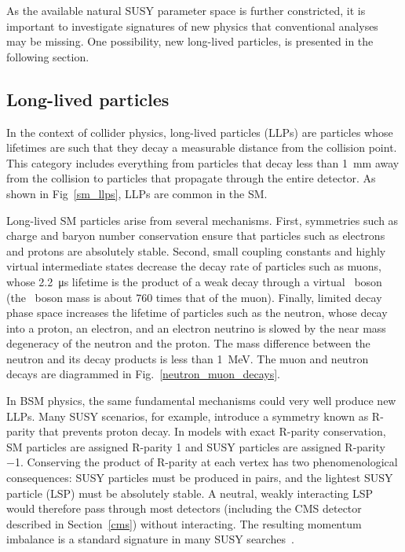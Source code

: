 

As the available natural SUSY parameter space is further constricted, it is important to investigate signatures of new physics that conventional analyses may be missing. One possibility, new long-lived particles, is presented in the following section.

\subsection{Long-lived particles}
\label{llps}
In the context of collider physics, long-lived particles (LLPs) are particles whose lifetimes are such that they decay a measurable distance from the collision point. This category includes everything from particles that decay less than \SI{1}{\mm} away from the collision to particles that propagate through the entire detector. As shown in Fig~\ref{sm_llps}, LLPs are common in the SM.



Long-lived SM particles arise from several mechanisms. First, symmetries such as charge and baryon number conservation ensure that particles such as electrons and protons are absolutely stable. Second, small coupling constants and highly virtual intermediate states decrease the decay rate of particles such as muons, whose \SI{2.2}{\us} lifetime is the product of a weak decay through a virtual \PW\ boson (the \PW\ boson mass is about \num{760} times that of the muon). Finally, limited decay phase space increases the lifetime of particles such as the neutron, whose decay into a proton, an electron, and an electron neutrino is slowed by the near mass degeneracy of the neutron and the proton. The mass difference between the neutron and its decay products is less than \SI{1}{\MeV}. The muon and neutron decays are diagrammed in Fig.~\ref{neutron_muon_decays}.



In BSM physics, the same fundamental mechanisms could very well produce new LLPs. Many SUSY scenarios, for example, introduce a symmetry known as R-parity that prevents proton decay. In models with exact R-parity conservation, SM particles are assigned R-parity \num{+1} and SUSY particles are assigned R-parity \num{-1}. Conserving the product of R-parity at each vertex has two phenomenological consequences: SUSY particles must be produced in pairs, and the lightest SUSY particle (LSP) must be absolutely stable. A neutral, weakly interacting LSP would therefore pass through most detectors (including the CMS detector described in Section~\ref{cms}) without interacting. The resulting momentum imbalance is a standard signature in many SUSY searches~\cite{pdg_2020}.

